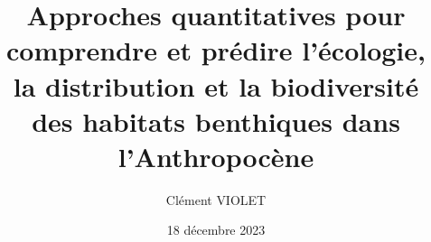 





\author{Clément VIOLET}

\title{Approches quantitatives pour comprendre et prédire l’écologie,\\la distribution et la biodiversité des habitats benthiques dans\\l’Anthropocène}

\date{18 décembre 2023}


\numthese{} %

